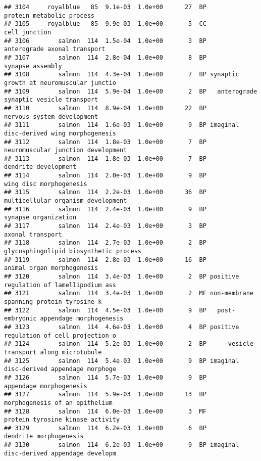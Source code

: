 \documentclass[]{article}
\begin{document}
\begin{verbatim}
## 3104     royalblue   85  9.1e-03  1.0e+00      27  BP                protein metabolic process
## 3105     royalblue   85  9.9e-03  1.0e+00       5  CC                            cell junction
## 3106        salmon  114  1.5e-04  1.0e+00       3  BP             anterograde axonal transport
## 3107        salmon  114  2.8e-04  1.0e+00       8  BP                         synapse assembly
## 3108        salmon  114  4.3e-04  1.0e+00       7  BP synaptic growth at neuromuscular junctio
## 3109        salmon  114  5.9e-04  1.0e+00       2  BP   anterograde synaptic vesicle transport
## 3110        salmon  114  8.9e-04  1.0e+00      22  BP               nervous system development
## 3111        salmon  114  1.6e-03  1.0e+00       9  BP imaginal disc-derived wing morphogenesis
## 3112        salmon  114  1.8e-03  1.0e+00       7  BP       neuromuscular junction development
## 3113        salmon  114  1.8e-03  1.0e+00       7  BP                     dendrite development
## 3114        salmon  114  2.0e-03  1.0e+00       9  BP                  wing disc morphogenesis
## 3115        salmon  114  2.2e-03  1.0e+00      36  BP       multicellular organism development
## 3116        salmon  114  2.4e-03  1.0e+00       9  BP                     synapse organization
## 3117        salmon  114  2.4e-03  1.0e+00       3  BP                         axonal transport
## 3118        salmon  114  2.7e-03  1.0e+00       2  BP   glycosphingolipid biosynthetic process
## 3119        salmon  114  2.8e-03  1.0e+00      16  BP               animal organ morphogenesis
## 3120        salmon  114  3.4e-03  1.0e+00       2  BP positive regulation of lamellipodium ass
## 3121        salmon  114  3.4e-03  1.0e+00       2  MF non-membrane spanning protein tyrosine k
## 3122        salmon  114  4.5e-03  1.0e+00       9  BP   post-embryonic appendage morphogenesis
## 3123        salmon  114  4.6e-03  1.0e+00       4  BP positive regulation of cell projection o
## 3124        salmon  114  5.2e-03  1.0e+00       2  BP      vesicle transport along microtubule
## 3125        salmon  114  5.4e-03  1.0e+00       9  BP imaginal disc-derived appendage morphoge
## 3126        salmon  114  5.7e-03  1.0e+00       9  BP                  appendage morphogenesis
## 3127        salmon  114  5.9e-03  1.0e+00      13  BP           morphogenesis of an epithelium
## 3128        salmon  114  6.0e-03  1.0e+00       3  MF         protein tyrosine kinase activity
## 3129        salmon  114  6.2e-03  1.0e+00       6  BP                   dendrite morphogenesis
## 3130        salmon  114  6.2e-03  1.0e+00       9  BP imaginal disc-derived appendage developm

\end{verbatim}
\end{document}
